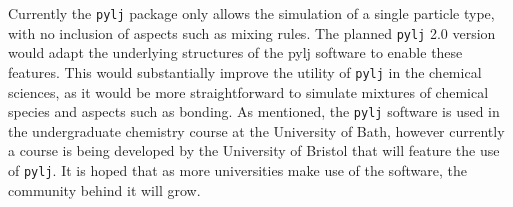 Currently the \texttt{pylj} package only allows the simulation of a single particle type, with no inclusion of aspects such as mixing rules.
The planned \texttt{pylj} 2.0 version would adapt the underlying structures of the pylj software to enable these features.
This would substantially improve the utility of \texttt{pylj} in the chemical sciences, as it would be more straightforward to simulate mixtures of chemical species and aspects such as bonding.
As mentioned, the \texttt{pylj} software is used in the undergraduate chemistry course at the University of Bath, however currently a course is being developed by the University of Bristol that will feature the use of \texttt{pylj}.
It is hoped that as more universities make use of the software, the community behind it will grow.
